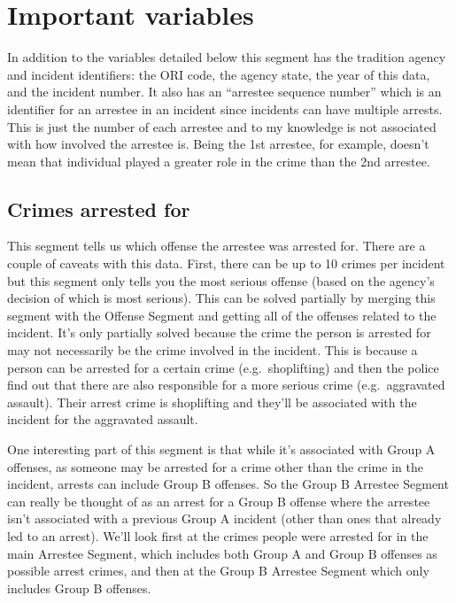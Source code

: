 \documentclass[
  12pt,
  openany]{book}
\begin{document}
\hypertarget{important-variables-4}{%
\section{Important variables}\label{important-variables-4}}

In addition to the variables detailed below this segment has the tradition agency and incident identifiers: the ORI code, the agency state, the year of this data, and the incident number. It also has an ``arrestee sequence number'' which is an identifier for an arrestee in an incident since incidents can have multiple arrests. This is just the number of each arrestee and to my knowledge is not associated with how involved the arrestee is. Being the 1st arrestee, for example, doesn't mean that individual played a greater role in the crime than the 2nd arrestee.

\hypertarget{crimes-arrested-for}{%
\subsection{Crimes arrested for}\label{crimes-arrested-for}}

This segment tells us which offense the arrestee was arrested for. There are a couple of caveats with this data. First, there can be up to 10 crimes per incident but this segment only tells you the most serious offense (based on the agency's decision of which is most serious). This can be solved partially by merging this segment with the Offense Segment and getting all of the offenses related to the incident. It's only partially solved because the crime the person is arrested for may not necessarily be the crime involved in the incident. This is because a person can be arrested for a certain crime (e.g.~shoplifting) and then the police find out that there are also responsible for a more serious crime (e.g.~aggravated assault). Their arrest crime is shoplifting and they'll be associated with the incident for the aggravated assault.

One interesting part of this segment is that while it's associated with Group A offenses, as someone may be arrested for a crime other than the crime in the incident, arrests can include Group B offenses. So the Group B Arrestee Segment can really be thought of as an arrest for a Group B offense where the arrestee isn't associated with a previous Group A incident (other than ones that already led to an arrest). We'll look first at the crimes people were arrested for in the main Arrestee Segment, which includes both Group A and Group B offenses as possible arrest crimes, and then at the Group B Arrestee Segment which only includes Group B offenses.
\end{document}
